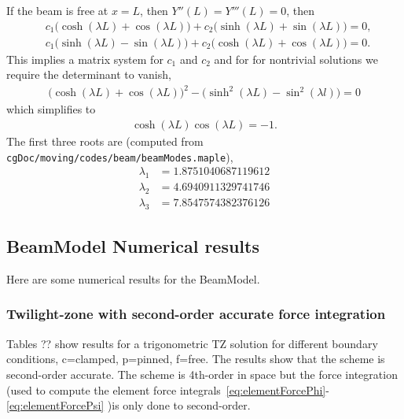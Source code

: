 \documentclass[11pt]{article}
\begin{document}
If the beam is free at $x=L$, then $Y''(L)=Y'''(L)=0$, 
then
\begin{align*}
  &  c_1 \big(\cosh(\lambda L) +\cos(\lambda L) \big) + c_2 \big(\sinh(\lambda L) + \sin(\lambda L)\big) = 0 , \\
  &  c_1 \big(\sinh(\lambda L) -\sin(\lambda L) \big) + c_2 \big(\cosh(\lambda L) + \cos(\lambda L)\big) = 0 . 
\end{align*}
This implies a matrix system for $c_1$ and $c_2$ and for 
for nontrivial solutions we require the determinant to vanish, 
\begin{align*}
   \big(\cosh(\lambda L) +\cos(\lambda L) \big)^2 - \big( \sinh^2(\lambda L) - \sin^2(\lambda l) \big)=0
\end{align*}
which simplifies to
\begin{align*}
   \cosh(\lambda L)\cos(\lambda L) = -1 .
\end{align*}
The first three roots are (computed from {\tt cgDoc/moving/codes/beam/beamModes.maple}),
\begin{align*}
   \lambda_1 &=1.8751040687119612  \\
   \lambda_2 &=4.6940911329741746  \\
   \lambda_3 &=7.8547574382376126
\end{align*}


\clearpage
\subsection{BeamModel Numerical results} \label{eq:BeamModel_Results}


Here are some numerical results for the BeamModel.


\subsubsection{Twilight-zone with second-order accurate force integration} 

Tables ?? show results for a trigonometric TZ solution for different boundary conditions, c=clamped, p=pinned, f=free.
The results show that the scheme is second-order accurate. 
The scheme is 4th-order in space but the force integration (used to compute the element
force integrals~\eqref{eq:elementForcePhi}-\eqref{eq:elementForcePsi} )is only done to second-order.
\end{document}
